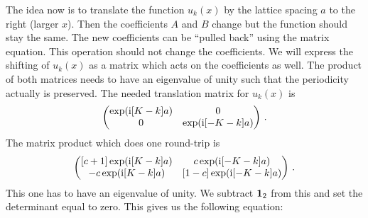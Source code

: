 \documentclass[11pt, english, fleqn, DIV=15, headinclude, BCOR=1cm]{scrartcl}
\begin{document}
The idea now is to translate the function $u_k(x)$ by the lattice spacing $a$
to the right (larger $x$). Then the coefficients $A$ and $B$ change but the
function should stay the same. The new coefficients can be “pulled back” using
the matrix equation. This operation should not change the coefficients. We will
express the shifting of $u_k(x)$ as a matrix which acts on the coefficients as
well. The product of both matrices needs to have an eigenvalue of unity such
that the periodicity actually is preserved. The needed translation matrix for
$u_k(x)$ is
\[
    \begin{pmatrix}
        \exp(\mathrm i [K - k] a) & 0 \\
        0 & \exp(\mathrm i [-K - k] a)
    \end{pmatrix} \,.
\]
The matrix product which does one round-trip is
\[
    \begin{pmatrix}
        [c+1] \exp(\mathrm i [K - k] a) & c \exp(\mathrm i [- K - k] a) \\
        -c \exp(\mathrm i [K - k] a) & [1-c] \exp(\mathrm i [- K - k] a) \\
    \end{pmatrix} \,.
\]
This one has to have an eigenvalue of unity. We subtract $\mat 1_2$ from this
and set the determinant equal to zero. This gives us the following equation:
\end{document}
